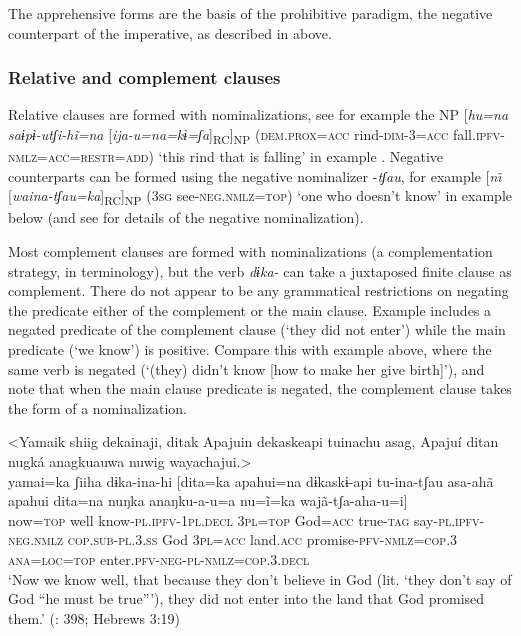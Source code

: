\documentclass[output=paper,colorlinks,citecolor=brown,draft]{langscibook}
\begin{document}
The apprehensive forms are the basis of the prohibitive paradigm, the negative counterpart of the imperative, as described in  above.

\subsubsection{Relative and complement clauses}\label{sec:agu:2.4.4}
\largerpage
Relative clauses are formed with nominalizations, see for example the NP [\textit{hu=na saɨpɨ{}-utʃi-hĩ=na} [\textit{ija-u=na=kɨ=ʃa}]\textsubscript{RC}]\textsubscript{NP} (\textsc{dem.prox=acc} rind-\textsc{dim-3=acc} fall.\textsc{ipfv-nmlz=acc=restr=add)} \textsc{‘}this rind that is falling’ in example . Negative counterparts can be formed using the negative nominalizer \nobreakdash-\textit{tʃau}, for example [\textit{n\~\i} [\textit{waina-tʃau=ka}]\textsubscript{RC}]\textsubscript{NP} (\textsc{3sg} see-\textsc{neg.nmlz=top}) ‘one who doesn’t know’ in example  below (and see  for details of the negative nominalization).

Most complement clauses are formed with nominalizations (a complementation strategy, in  terminology), but the verb \textit{dɨka-} can take a juxtaposed finite clause as complement. There do not appear to be any grammatical restrictions on negating the predicate either of the complement or the main clause. Example  includes a negated predicate of the complement clause (‘they did not enter’) while the main predicate (‘we know’) is positive. Compare this with example  above, where the same verb is negated (‘(they) didn’t know [how to make her give birth]’), and note that when the main clause predicate is negated, the complement clause takes the form of a nominalization.

\ea\label{ex:agu:39}
    \glll <Yamaik shiig dekainaji, ditak Apajuin dekaskeapi tuinachu asag, Apajuí ditan nugká anagkuauwa nuwig wayachajui.> \\ 
          yamai=ka  ʃiiha  dɨka-ina-hi  [dita=ka  apahui=na dɨkaskɨ-api  tu-ina-tʃau  asa-ahã  apahui  dita=na nuŋka  anaŋku-a-u=a  nu=ĩ=ka wajã-tʃa-aha-u=i] \\
          now=\textsc{top}  well  know-\textsc{pl.ipfv-1pl.decl}  \textsc{3pl=top}  God=\textsc{acc} true-\textsc{tag}  say-\textsc{pl.ipfv-neg.nmlz}  \textsc{cop.sub-pl.3.ss}  God  \textsc{3pl=acc} land.\textsc{acc}  promise-\textsc{pfv-nmlz=cop.3}  \textsc{ana=loc=top} enter.\textsc{pfv}{}-\textsc{neg-pl-nmlz=cop.3.decl} \\
    \glt ‘Now we know well, that because they don’t believe in God (lit. ‘they don’t say of God “he must be true”’), they did not enter into the land that God promised them.’ (\citealt{LigaBíblica2008}: 398; Hebrews 3:19)
\z 
  
\end{document}

